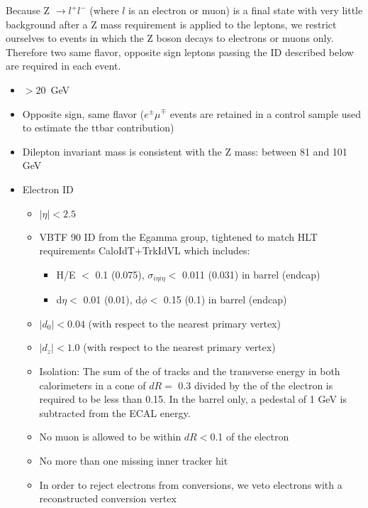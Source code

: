 Because Z $\rightarrow l^+l^-$ (where $l$ is an electron or muon) is a final state with very little background after a Z mass requirement is applied to the leptons,
 we restrict ourselves to events in which the Z boson decays to electrons or muons only.
 Therefore two same flavor, opposite sign leptons passing the ID described below are required in each event. 

\begin{itemize}
\item \pt $> 20$~GeV
\item Opposite sign, same flavor ($e^\pm\mu^\mp$ events are retained in a control sample used to estimate the ttbar contribution)
\item Dilepton invariant mass is consistent with the Z mass: between 81 and 101 GeV


\item Electron ID
  \begin{itemize}
  \item $|\eta| < 2.5$
  \item VBTF 90 ID from the Egamma group\cite{ref:vbtf}, 
	tightened to match HLT requirements CaloIdT+TrkIdVL which includes: \cite{ref:eghlt}
	\begin{itemize}
	\item H/E $<$ 0.1 (0.075), $\sigma_{i\eta i\eta} <$ 0.011 (0.031) in barrel (endcap)
	\item d$\eta <$ 0.01 (0.01), d$\phi <$ 0.15 (0.1) in barrel (endcap)
	\end{itemize}
  \item $|d_0| <0.04$ (with respect to the nearest primary vertex)
  \item $|d_z| <1.0$ (with respect to the nearest primary vertex)
  \item Isolation: The sum of the \pt of tracks and the transverse energy in both calorimeters in a cone of $dR =$ 0.3 divided by the \pt of the electron is required to be less than 0.15. In the barrel only, a pedestal of 1 GeV is subtracted from the ECAL energy.
  \item No muon is allowed to be within $dR < $0.1 of the electron
  \item No more than one missing inner tracker hit \cite{ref:sntconv}
  \item In order to reject electrons from conversions, we veto electrons with a reconstructed conversion vertex \cite{ref:borisconv}


\end{itemize}
\end{itemize}

